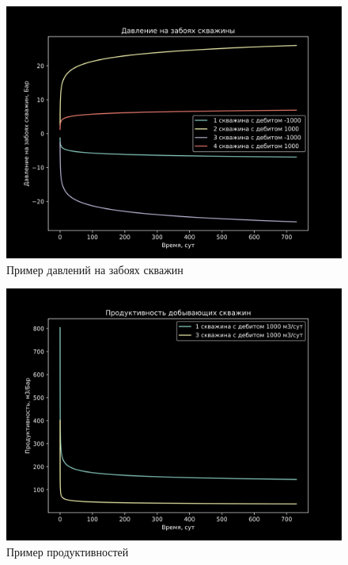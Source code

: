 \documentclass{article}
\begin{document}
\begin{figure}[h]
    \centering
    \includegraphics[width=1.0\textwidth]{давление_забой.png}
    \caption{Пример давлений на забоях скважин}
\end{figure}

\begin{figure}[h]
    \centering
    \includegraphics[width=1.0\textwidth]{продуктивность.png}
    \caption{Пример продуктивностей}
\end{figure}
\end{document}
